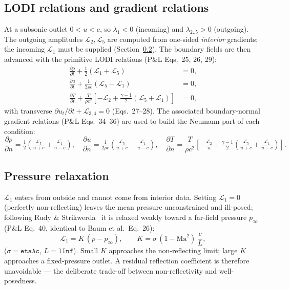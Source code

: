 \documentclass[11pt,a4paper]{article}
\newcommand{\dt}[1]{\frac{\partial #1}{\partial t}}
\newcommand{\dn}[1]{\frac{\partial #1}{\partial n}}
\newcommand{\Lc}{\mathcal{L}}
\newcommand{\code}[1]{\texttt{#1}}
\begin{document}
\subsection{LODI relations and gradient relations}
At a subsonic outlet $0<u<c$, so $\lambda_1<0$ (incoming) and
$\lambda_{2..5}>0$ (outgoing). The outgoing amplitudes $\Lc_2,\Lc_5$ are
computed from one-sided \emph{interior} gradients; the incoming $\Lc_1$ must be
supplied (Section~\ref{sec:relax}). The boundary fields are then advanced with
the primitive LODI relations (P\&L Eqs.~25, 26, 29):
\begin{align}
  \dt{p}+\tfrac12(\Lc_1+\Lc_5)&=0, \label{eq:lodip}\\
  \dt{u}+\tfrac{1}{2\rho c}(\Lc_5-\Lc_1)&=0, \label{eq:lodiu}\\
  \dt{T}+\frac{T}{\rho c^2}\!\left[-\Lc_2+\tfrac{\gamma-1}{2}(\Lc_5+\Lc_1)\right]&=0,
  \label{eq:lodiT}
\end{align}
with transverse $\partial u_{t}/\partial t+\Lc_{3,4}=0$ (Eqs.~27--28). The
associated boundary-normal gradient relations (P\&L Eqs.~34--36) are used to
build the Neumann part of each condition:
\begin{equation}
  \dn{p}=\tfrac12\!\left(\tfrac{\Lc_5}{u+c}+\tfrac{\Lc_1}{u-c}\right),\quad
  \dn{u}=\tfrac{1}{2\rho c}\!\left(\tfrac{\Lc_5}{u+c}-\tfrac{\Lc_1}{u-c}\right),\quad
  \dn{T}=\frac{T}{\rho c^2}\!\left[-\tfrac{\Lc_2}{u}+\tfrac{\gamma-1}{2}\!\left(\tfrac{\Lc_5}{u+c}+\tfrac{\Lc_1}{u-c}\right)\right].
  \label{eq:grad}
\end{equation}

\subsection{Pressure relaxation}\label{sec:relax}
$\Lc_1$ enters from outside and cannot come from interior data. Setting
$\Lc_1=0$ (perfectly non-reflecting) leaves the mean pressure unconstrained and
ill-posed; following Rudy \& Strikwerda~\cite{RS80} it is relaxed weakly toward
a far-field pressure $p_\infty$ (P\&L Eq.~40, identical to Baum et al.\ Eq.~26):
\begin{equation}
  \Lc_1=K\,(p-p_\infty),\qquad K=\sigma\,(1-\mathrm{Ma}^2)\,\frac{c}{L},
  \label{eq:relaxK}
\end{equation}
($\sigma=\code{etaAc}$, $L=\code{lInf}$). Small $K$ approaches the
non-reflecting limit; large $K$ approaches a fixed-pressure outlet. A residual
reflection coefficient is therefore unavoidable --- the deliberate trade-off
between non-reflectivity and well-posedness.
\end{document}
